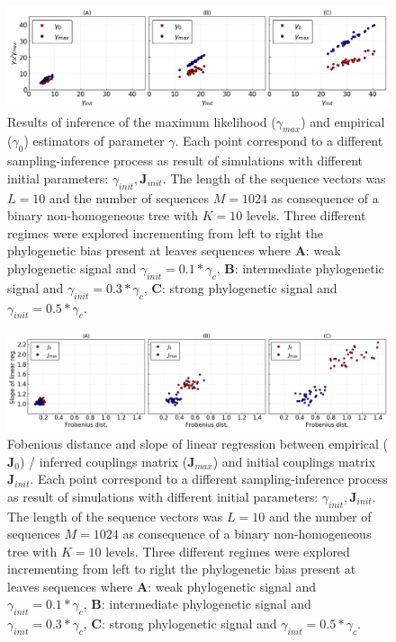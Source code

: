 \documentclass[preprint,amsmath,amssymb,superscriptaddress,showpacs,pre]{revtex4-1}
\begin{document}
\begin{figure}[!htb]
\includegraphics[keepaspectratio=true,width=1.0\textwidth]{Figures/gamma_panel_L10_M1024.png}
	\vspace{-1mm}
\caption{{ Results of inference of the  maximum likelihood ($\gamma_{max}$) and empirical ($\gamma_{0}$)  estimators of parameter $\gamma$. Each point correspond to a different sampling-inference process as result of simulations with different initial parameters: $\gamma_{init},\bm J_{init}$. The length of the sequence vectors was $L=10$ and the number of sequences  $M=1024$ as consequence of a binary non-homogeneous tree with $K=10$ levels. Three different regimes were explored incrementing from left to right the  phylogenetic bias present at leaves sequences where \textbf{A}: weak phylogenetic signal and   $\gamma_{init}=0.1*\gamma_c$, \textbf{B}: intermediate phylogenetic signal  and $\gamma_{init}=0.3*\gamma_c$, \textbf{C}: strong phylogenetic signal and $\gamma_{init}=0.5*\gamma_c$. }} \label{results_gamma10_n10}
\end{figure}
	
\begin{figure}[!htb]
	\includegraphics[keepaspectratio=true,width=1.0\textwidth]{Figures/couplings_panel_frob_dist_vs_lin_reg_slope_L10_M1024_same_range.png}
\vspace{-1mm}
\caption{{ Fobenious distance and  slope of linear regression between empirical ($\bm J_{0}$) / inferred couplings matrix ($\bm J_{max}$) and initial couplings matrix $\bm J_{init}$.  Each point correspond to a different sampling-inference process as result of simulations with different initial parameters: $\gamma_{init},\bm J_{init}$. The length of the sequence vectors was $L=10$ and the number of sequences  $M=1024$ as consequence of a binary non-homogeneous tree with $K=10$ levels. Three different regimes were explored incrementing from left to right the  phylogenetic bias present at leaves sequences where \textbf{A}: weak phylogenetic signal and   $\gamma_{init}=0.1*\gamma_c$, \textbf{B}: intermediate phylogenetic signal  and $\gamma_{init}=0.3*\gamma_c$, \textbf{C}: strong phylogenetic signal and $\gamma_{init}=0.5*\gamma_c$.}} 
\label{results_corr_map_J_10_n10}
\end{figure}	
	
\end{document}
